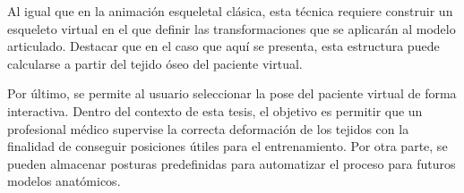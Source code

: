 Al igual que en la animación esqueletal clásica, esta técnica requiere construir un esqueleto virtual en el que definir las transformaciones que se aplicarán al modelo articulado. Destacar que en el caso que aquí se presenta, esta estructura puede calcularse a partir del tejido óseo del paciente virtual.




Por último, se permite al usuario seleccionar la pose del paciente virtual de forma interactiva. Dentro del contexto de esta tesis, el objetivo es permitir que un profesional médico supervise la correcta deformación de los tejidos\del{,} con la finalidad de conseguir posiciones útiles para el entrenamiento. Por otra parte, se pueden almacenar posturas predefinidas para automatizar el proceso para futuros modelos anatómicos.





